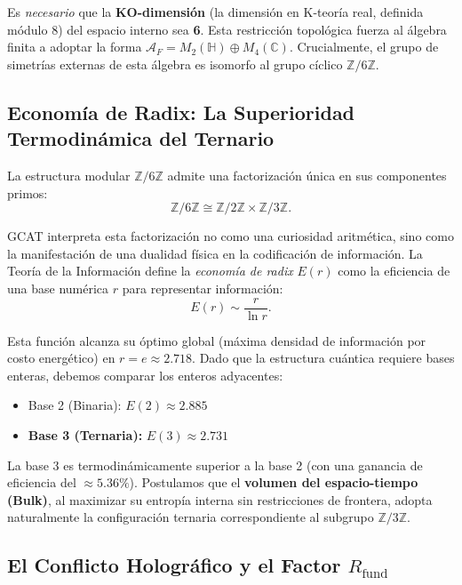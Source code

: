 \documentclass[12pt, a4paper]{article}
\theoremstyle{plain}
\theoremstyle{definition}
\begin{document}
Es \textit{necesario} que la \textbf{KO-dimensión} (la dimensión en K-teoría real, definida módulo 8) del espacio interno sea \textbf{6}. Esta restricción topológica fuerza al álgebra finita a adoptar la forma $\mathcal{A}_F = M_2(\mathbb{H}) \oplus M_4(\mathbb{C})$. Crucialmente, el grupo de simetrías externas de esta álgebra es isomorfo al grupo cíclico $\mathbb{Z}/6\mathbb{Z}$.

\subsection{Economía de Radix: La Superioridad Termodinámica del Ternario}

La estructura modular $\mathbb{Z}/6\mathbb{Z}$ admite una factorización única en sus componentes primos:
\begin{equation}
\mathbb{Z}/6\mathbb{Z} \cong \mathbb{Z}/2\mathbb{Z} \times \mathbb{Z}/3\mathbb{Z}.
\label{eq:factorization}
\end{equation}

GCAT interpreta esta factorización no como una curiosidad aritmética, sino como la manifestación de una dualidad física en la codificación de información. La Teoría de la Información define la \textit{economía de radix} $E(r)$ como la eficiencia de una base numérica $r$ para representar información:
\begin{equation}
E(r) \sim \frac{r}{\ln r}.
\end{equation}

Esta función alcanza su óptimo global (máxima densidad de información por costo energético) en $r = e \approx 2.718$. Dado que la estructura cuántica requiere bases enteras, debemos comparar los enteros adyacentes:
\begin{itemize}
    \item Base 2 (Binaria): $E(2) \approx 2.885$
    \item \textbf{Base 3 (Ternaria):} $E(3) \approx 2.731$
\end{itemize}

La base 3 es termodinámicamente superior a la base 2 (con una ganancia de eficiencia del $\approx 5.36\%$). Postulamos que el \textbf{volumen del espacio-tiempo (Bulk)}, al maximizar su entropía interna sin restricciones de frontera, adopta naturalmente la configuración ternaria correspondiente al subgrupo $\mathbb{Z}/3\mathbb{Z}$.

\subsection{El Conflicto Holográfico y el Factor \texorpdfstring{$R_{\text{fund}}$}{Rfund}}
\end{document}
